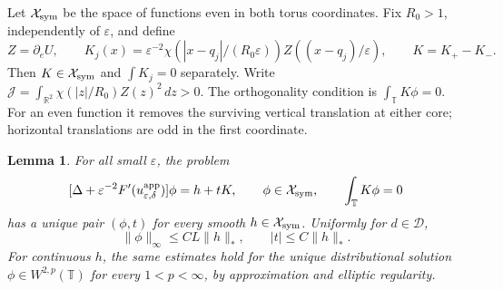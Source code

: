 \documentclass[11pt,reqno]{amsart}
\numberwithin{equation}{section}
\newtheorem{lemma}[theorem]{Lemma}
\theoremstyle{definition}
\theoremstyle{remark}
\newcommand{\R}{\mathbb R}
\newcommand{\T}{\mathbb T}
\newcommand{\eps}{\varepsilon}
\begin{document}
Let $\mathcal X_{\rm sym}$ be the space of functions even in both torus
coordinates. Fix $R_0>1$, independently of $\eps$, and define
\begin{equation}\label{cs:eq:K}
 Z=\partial_eU,\qquad
 K_j(x)=\eps^{-2}\chi(|x-q_j|/(R_0\eps))Z((x-q_j)/\eps),
 \qquad K=K_+-K_- .
\end{equation}
Then $K\in\mathcal X_{\rm sym}$ and $\int K_j=0$ separately.
Write
\(\mathcal J=\int_{\R^2}\chi(|z|/R_0)Z(z)^2\,dz>0.\)
The orthogonality condition is $\int_\T K\phi=0$.
For an even function it removes the surviving vertical translation
at either core; horizontal translations are odd in the first coordinate.

\begin{lemma}\label{cs:lem:inverse}
For all small $\eps$, the problem
\begin{equation}\label{cs:eq:linear}
 [\Delta+\eps^{-2}F'(u^{\mathrm{app}}_{\eps,\delta})]\phi=h+tK,\qquad
 \phi\in\mathcal X_{\rm sym},\qquad \int_\T K\phi=0
\end{equation}
has a unique pair $(\phi,t)$ for every smooth $h\in\mathcal X_{\rm sym}$.
Uniformly for $d\in\mathcal D$,
\begin{equation}\label{cs:eq:inverse}
 \|\phi\|_\infty\le CL\|h\|_*,\qquad |t|\le C\|h\|_*.
\end{equation}
For continuous $h$, the same estimates hold for the unique
distributional solution $\phi\in W^{2,p}(\T)$ for every
$1<p<\infty$, by approximation and elliptic regularity.
\end{lemma}
\end{document}
